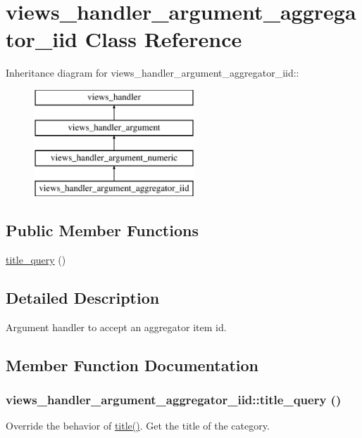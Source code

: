 \hypertarget{classviews__handler__argument__aggregator__iid}{
\section{views\_\-handler\_\-argument\_\-aggregator\_\-iid Class Reference}
\label{classviews__handler__argument__aggregator__iid}
}
Inheritance diagram for views\_\-handler\_\-argument\_\-aggregator\_\-iid::\begin{figure}[H]
\begin{center}
\leavevmode
\includegraphics[height=4cm]{classviews__handler__argument__aggregator__iid}
\end{center}
\end{figure}
\subsection*{Public Member Functions}
\begin{DoxyCompactItemize}
\item 
\hyperlink{classviews__handler__argument__aggregator__iid_aeae3f76b2f4a4355f556cef9effa109d}{title\_\-query} ()
\end{DoxyCompactItemize}


\subsection{Detailed Description}
Argument handler to accept an aggregator item id. 

\subsection{Member Function Documentation}
\hypertarget{classviews__handler__argument__aggregator__iid_aeae3f76b2f4a4355f556cef9effa109d}{
\subsubsection[{title\_\-query}]{\setlength{\rightskip}{0pt plus 5cm}views\_\-handler\_\-argument\_\-aggregator\_\-iid::title\_\-query ()}}
\label{classviews__handler__argument__aggregator__iid_aeae3f76b2f4a4355f556cef9effa109d}
Override the behavior of \hyperlink{classviews__handler__argument__numeric_a480758dbcde899b5483b091e51e2bf39}{title()}. Get the title of the category. 

